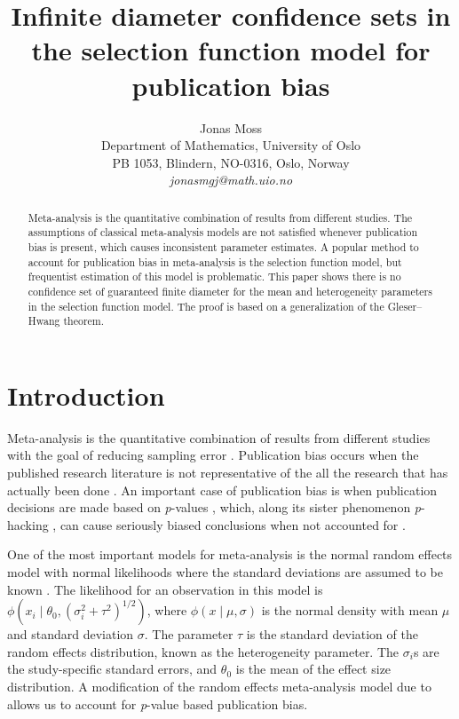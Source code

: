 \documentclass[twoside]{article}
\title{Infinite diameter confidence sets in the selection function model for publication bias}
\author{
  Jonas Moss \orcid{0000-0002-6876-6964} \\
  Department of Mathematics, University of Oslo\\
  PB 1053, Blindern, NO-0316, Oslo, Norway \\
  \it{jonasmgj@math.uio.no}
}
\begin{document}
\maketitle
\begin{abstract}
Meta-analysis is the quantitative combination of results from different studies. The assumptions of classical meta-analysis models are not satisfied whenever publication bias is present, which causes inconsistent parameter estimates. A popular method to account for publication bias in meta-analysis is the selection function model, but frequentist estimation of this model is problematic. This paper shows there is no confidence set of guaranteed finite diameter for the mean and heterogeneity parameters in the selection function model. The proof is based on a generalization of the Gleser--Hwang theorem.
\end{abstract}


\section{Introduction}

Meta-analysis is the quantitative combination of results from different studies with the goal of reducing sampling error \citep{lipsey2001practical}.
Publication bias occurs when the published research literature is
not representative of the all the research that has actually been
done \citep{rothstein2006publication}. An important case of publication
bias is when publication decisions are made based on \textit{p}-values
\citep{sterling1959publication}, which, along its sister phenomenon \textit{p}-hacking \citep{simmons2011false},
can cause seriously biased conclusions when not accounted
for \citep{simmons2011false,moss2019modelling}.

One of the most important models for meta-analysis is the normal random effects
model with normal likelihoods where the
standard deviations are assumed to be known \citep{hedges1998fixed}.
The likelihood for an observation in this model is $\phi(x_{i}\mid\theta_{0},(\sigma_{i}^{2}+\tau^{2})^{1/2})$,
where $\phi(x\mid\mu,\sigma)$ is the normal density with
mean $\mu$ and standard deviation $\sigma$. The parameter $\tau$ is the standard deviation of the random effects distribution, known as the heterogeneity parameter. The $\sigma_i$s are the study-specific standard errors, and $\theta_0$ is the mean of the effect size distribution. A modification of the random effects meta-analysis model due to \citet{hedges1984estimation}
allows us to account for \textit{p}-value based publication bias.
\end{document}
